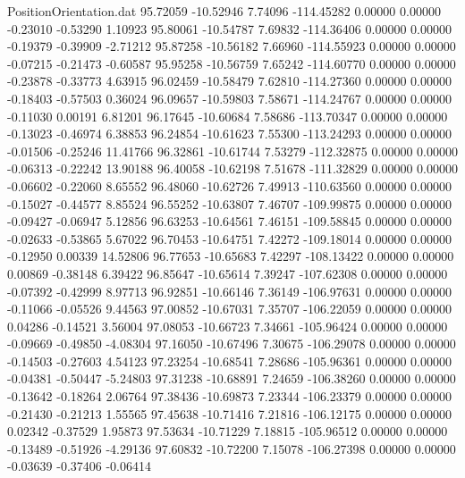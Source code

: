 \begin{filecontents}{PositionOrientation.dat}
  95.72059  -10.52946    7.74096  -114.45282    0.00000    0.00000   -0.23010   -0.53290    1.10923
  95.80061  -10.54787    7.69832  -114.36406    0.00000    0.00000   -0.19379   -0.39909   -2.71212
  95.87258  -10.56182    7.66960  -114.55923    0.00000    0.00000   -0.07215   -0.21473   -0.60587
  95.95258  -10.56759    7.65242  -114.60770    0.00000    0.00000   -0.23878   -0.33773    4.63915
  96.02459  -10.58479    7.62810  -114.27360    0.00000    0.00000   -0.18403   -0.57503    0.36024
  96.09657  -10.59803    7.58671  -114.24767    0.00000    0.00000   -0.11030    0.00191    6.81201
  96.17645  -10.60684    7.58686  -113.70347    0.00000    0.00000   -0.13023   -0.46974    6.38853
  96.24854  -10.61623    7.55300  -113.24293    0.00000    0.00000   -0.01506   -0.25246   11.41766
  96.32861  -10.61744    7.53279  -112.32875    0.00000    0.00000   -0.06313   -0.22242   13.90188
  96.40058  -10.62198    7.51678  -111.32829    0.00000    0.00000   -0.06602   -0.22060    8.65552
  96.48060  -10.62726    7.49913  -110.63560    0.00000    0.00000   -0.15027   -0.44577    8.85524
  96.55252  -10.63807    7.46707  -109.99875    0.00000    0.00000   -0.09427   -0.06947    5.12856
  96.63253  -10.64561    7.46151  -109.58845    0.00000    0.00000   -0.02633   -0.53865    5.67022
  96.70453  -10.64751    7.42272  -109.18014    0.00000    0.00000   -0.12950    0.00339   14.52806
  96.77653  -10.65683    7.42297  -108.13422    0.00000    0.00000    0.00869   -0.38148    6.39422
  96.85647  -10.65614    7.39247  -107.62308    0.00000    0.00000   -0.07392   -0.42999    8.97713
  96.92851  -10.66146    7.36149  -106.97631    0.00000    0.00000   -0.11066   -0.05526    9.44563
  97.00852  -10.67031    7.35707  -106.22059    0.00000    0.00000    0.04286   -0.14521    3.56004
  97.08053  -10.66723    7.34661  -105.96424    0.00000    0.00000   -0.09669   -0.49850   -4.08304
  97.16050  -10.67496    7.30675  -106.29078    0.00000    0.00000   -0.14503   -0.27603    4.54123
  97.23254  -10.68541    7.28686  -105.96361    0.00000    0.00000   -0.04381   -0.50447   -5.24803
  97.31238  -10.68891    7.24659  -106.38260    0.00000    0.00000   -0.13642   -0.18264    2.06764
  97.38436  -10.69873    7.23344  -106.23379    0.00000    0.00000   -0.21430   -0.21213    1.55565
  97.45638  -10.71416    7.21816  -106.12175    0.00000    0.00000    0.02342   -0.37529    1.95873
  97.53634  -10.71229    7.18815  -105.96512    0.00000    0.00000   -0.13489   -0.51926   -4.29136
  97.60832  -10.72200    7.15078  -106.27398    0.00000    0.00000   -0.03639   -0.37406   -0.06414

\end{filecontents}
